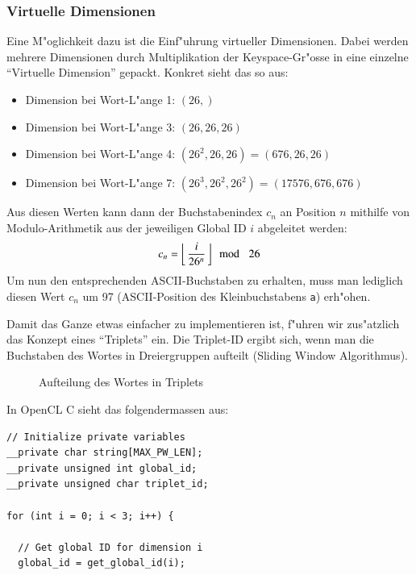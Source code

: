 \begin{refsection}
\subsubsection{Virtuelle Dimensionen}
\label{crypt:virtuelle_dimensionen}

Eine M"oglichkeit dazu ist die Einf"uhrung virtueller Dimensionen. Dabei werden
mehrere Dimensionen durch Multiplikation der Keyspace-Gr"osse in eine einzelne
``Virtuelle Dimension'' gepackt. Konkret sieht das so aus:

\begin{itemize}
	\item Dimension bei Wort-L"ange 1: $(26,)$
	\item Dimension bei Wort-L"ange 3: $(26, 26, 26)$
	\item Dimension bei Wort-L"ange 4: $(26^2, 26, 26) = (676, 26, 26)$
	\item Dimension bei Wort-L"ange 7: $(26^3, 26^2, 26^2) = (17576, 676, 676)$
\end{itemize}

\noindent Aus diesen Werten kann dann der Buchstabenindex $c_n$ an Position $n$
mithilfe von Modulo-Arithmetik aus der jeweiligen Global ID $i$ abgeleitet
werden:
\[
	c_n = \left\lfloor\,\frac{i}{26^n}\,\right\rfloor\! \mod\enskip 26
\]
Um nun den entsprechenden ASCII-Buchstaben zu erhalten, muss man lediglich
diesen Wert $c_n$ um 97 (ASCII-Position des Kleinbuchstabens \texttt{a})
erh"ohen.

Damit das Ganze etwas einfacher zu implementieren ist, f"uhren wir zus"atzlich
das Konzept eines ``Triplets'' ein. Die Triplet-ID ergibt sich, wenn man die
Buchstaben des Wortes in Dreiergruppen aufteilt (Sliding Window Algorithmus).

\begin{figure}[H]
	\centering
	
	\caption{Aufteilung des Wortes in Triplets}
	\label{img:crypto:triplets}
\end{figure}

\noindent In OpenCL C sieht das folgendermassen aus:

\begin{small}
\begin{verbatim}
// Initialize private variables
__private char string[MAX_PW_LEN];
__private unsigned int global_id;
__private unsigned char triplet_id;

for (int i = 0; i < 3; i++) {

  // Get global ID for dimension i
  global_id = get_global_id(i);


\end{verbatim}
\end{small}
\end{refsection}
